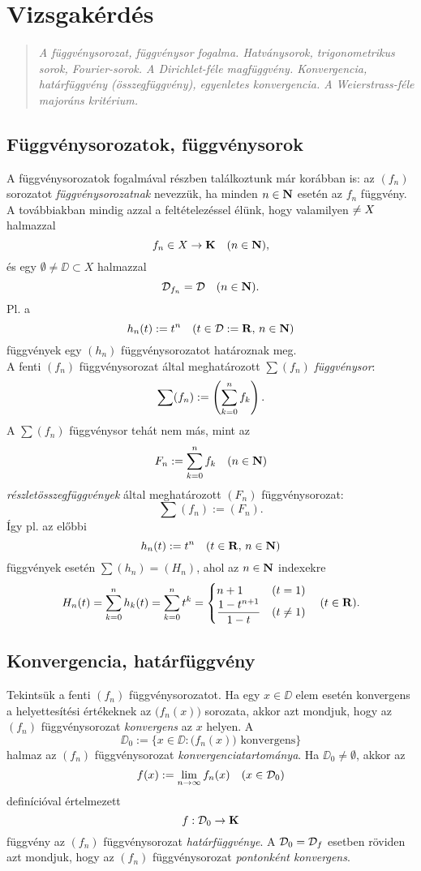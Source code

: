 \newpage
\section{Vizsgakérdés}
\begin{quote}
	\textit{A függvénysorozat, függvénysor fogalma. Hatványsorok, trigonometrikus sorok, Fourier-sorok. A Dirichlet-féle magfüggvény. Konvergencia, határfüggvény (összegfüggvény), egyenletes konvergencia. A Weierstrass-féle majoráns kritérium.}
\end{quote}

\subsection{Függvénysorozatok, függvénysorok}

A függvénysorozatok fogalmával részben találkoztunk már korábban is: az $(f_n)$ sorozatot \textit{függvénysorozatnak} nevezzük, ha minden $n \in \mathbf{N}$ esetén az $f_n$ függvény. A továbbiakban mindig azzal a feltételezéssel élünk, hogy valamilyen $\empty \neq X$ halmazzal
\[
	f_n \in X \to \mathbf{K} \quad (n \in \mathbf{N}),
\]
és egy $\emptyset \neq \DD \subset X$ halmazzal
\[
	\mathcal{D}_{f_n} = \mathcal{D} \quad (n \in \mathbf{N}).
\]
Pl. a
\[
	h_n(t) := t^n \quad (t \in \mathcal{D} := \mathbf{R}, \, n \in \mathbf{N})
\]
függvények egy $(h_n)$ függvénysorozatot határoznak meg.\\

A fenti $(f_n)$ függvénysorozat által meghatározott $\sum(f_n)$ \textit{függvénysor}:
\[
	\sum(f_n) := \left( \sum_{k=0}^n f_k \right).
\]
A $\sum(f_n)$ függvénysor tehát nem más, mint az
\[
	F_n := \sum_{k=0}^n f_k \quad (n \in \mathbf{N})
\]
\textit{részletösszegfüggvények} által meghatározott $(F_n)$ függvénysorozat:
\[
	\sum(f_n) := (F_n).
\]
Így pl. az előbbi
\[
	h_n(t) := t^n \quad (t \in \mathbf{R}, \, n \in \mathbf{N})
\]
függvények esetén $\sum(h_n) = (H_n)$, ahol az $n \in \mathbf{N}$ indexekre
\[
	H_n(t) = \sum_{k=0}^n h_k(t) = \sum_{k=0}^n t^k = \begin{cases}
		n + 1 & (t = 1) \\
		\displaystyle \frac{1-t^{n+1}}{1-t} & (t \neq 1)
	\end{cases} \quad (t \in \mathbf{R}).
\]

\subsection{Konvergencia, határfüggvény}

Tekintsük a fenti $(f_n)$ függvénysorozatot. Ha egy $x \in \DD$ elem esetén konvergens a helyettesítési értékeknek az $\big(f_n(x)\big)$ sorozata, akkor azt mondjuk, hogy az $(f_n)$ függvénysorozat \textit{konvergens} az $x$ helyen. A
\[
	\DD_0 := \big\{ x \in \DD : \big(f_n(x)\big) \text{ konvergens} \big\}
\]
halmaz az $(f_n)$ függvénysorozat \textit{konvergenciatartománya}. Ha $\DD_0 \neq \emptyset$, akkor az
\[
	f(x) := \lim_{n \to \infty} f_n(x) \quad (x \in \mathcal{D}_0)
\]
definícióval értelmezett
\[
	f : \mathcal{D}_0 \to \mathbf{K}
\]
függvény az $(f_n)$ függvénysorozat \textit{határfüggvénye}. A $\mathcal{D}_0 = \mathcal{D}_f$ esetben röviden azt mondjuk, hogy az $(f_n)$ függvénysorozat \textit{pontonként konvergens}.\\

